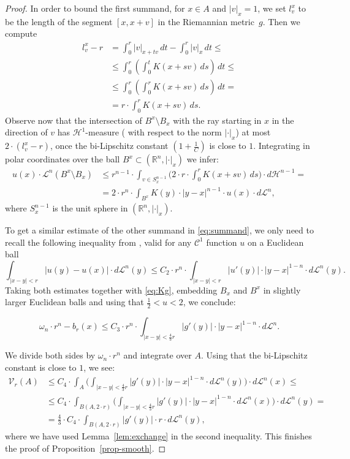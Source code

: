 \documentclass[12pt,leqno,intlimits]{amsart}
\numberwithin{equation}{section}
\theoremstyle{definition}
\theoremstyle{remark}
\newcommand{\lref}[1]{Lemma~\ref{#1}}
\newcommand{\R}{\mathbb{R}}
\begin{document}
\begin{proof}
In order to bound the first summand, for $x\in A$ and $|v|_x=1$, we set $l^x_v$ to be the length of the segment $[x,x+v]$
in the Riemannian metric~$g$. Then we compute
\begin{align*}
l_v ^x -r
&=
\int _0 ^r |v|_{x+tv} \, dt - \int _0 ^r |v|_x \, dt
\leq
\\
&\leq \int _0 ^r (\int _0 ^t K(x+sv) \, ds)\, dt
\leq
\\
&\leq \int _0 ^r (\int _0 ^r K(x+sv) \, ds)\, dt
=
\\
&= r\cdot \int _0 ^r K(x+sv) \, ds.
\end{align*}
Observe now that the intersection of $B^x\setminus B_x$ with the ray starting in $x$ in the direction of $v$ has $\mathcal H^1$-measure
( with respect to the norm $|\cdot |_x$)
at most $2\cdot (l_v^x -r)$, once the bi-Lipschitz constant $(1+\frac 1 C)$ is close to $1$.
Integrating in polar coordinates over the ball $B^x\subset (\R^n, |\cdot|_x)$ we infer:
\begin{align*}
u(x)\cdot \mathcal L^n (B^x\setminus B_x)
&\leq r^{n-1} \cdot \int _{v\in S^{n-1} _x}
\Big( 2\cdot r \cdot \int _0 ^r K(x+sv) \, ds \Big)
\cdot d\mathcal H^{n-1}  =
\\&=2{\cdot}r^n \cdot \int _{B^x} K(y) \cdot |y-x|^{n-1} \cdot u(x) \cdot d\mathcal L^n,
\end{align*}
where $S^{n-1} _x$ is the unit sphere in $(\R^n, |\cdot|_x)$.

To get a similar estimate of the other summand in \eqref{eq:summand},
we only need to recall the following inequality from \cite[Lemma 4.1]{Evans}, valid for any $\mathcal C^1$ function $u$ on a Euclidean ball
\[
\int _{|x-y| < r} |u(y)-u(x)| \cdot d\mathcal L^n (y) \leq C_2\cdot r^{n}\cdot \int _{|x-y| < r}|u'(y)| \cdot |y-x| ^{1-n} \cdot d\mathcal L^n (y).
\]
Taking both estimates together with \eqref{eq:Kg}, embedding $B_x$ and $B^x$ in slightly larger Euclidean balls and using that $\frac 1 2 < u <2$, we conclude:

\[
\omega _n \cdot r^n - b_r (x) \leq C_3\cdot r^n \cdot \int _{|x-y|< \frac 4 3 r} |g'(y)| \cdot |y-x|^{1-n} \cdot d\mathcal L^n.
\]

We divide both sides by $\omega _n \cdot r^n$ and integrate over $A$. Using that the bi-Lipschitz constant is close to $1$, we see:
\begin{align*}
\mathcal{V}_r (A) &\leq C_4\cdot \int _A \Big (\int _{|x-y|< \frac 4 3 r} |g'(y)| \cdot |y-x|^{1-n}\cdot d\mathcal L^n (y) \Big ) \cdot d\mathcal L^n (x) \leq
\\
&\leq C_4\cdot \int _{B (A,{2{\cdot}r})} \Big ( \int _{|x-y|< \frac 4 3 r} |g'(y)| \cdot |y-x|^{1-n} \cdot d\mathcal L^n (x) \Big ) \cdot d\mathcal L^n (y) =
\\
&= \frac 4 3\cdot  C_4\cdot \int _{B (A,{2{\cdot}r})} |g'(y)| \cdot r \cdot d\mathcal L^n (y),
\end{align*}
where we have used \lref{lem:exchange} in the second inequality.
This finishes the proof of Proposition~\ref{prop-smooth}.
\end{proof}
\end{document}

